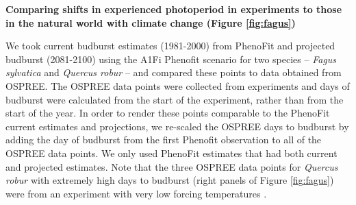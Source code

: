 \documentclass{article}
\begin{document}
\par \textbf{Comparing shifts in experienced photoperiod in experiments to those in the natural world with climate change (Figure \ref{fig:fagus})}
\par We took current budburst estimates (1981-2000) from PhenoFit \citep{duputie2015} and projected budburst (2081-2100) using the A1Fi Phenofit scenario for two species -- \textit{Fagus sylvatica} and \textit{Quercus robur} -- and compared these points to data obtained from OSPREE. The OSPREE data points were collected from experiments and days of budburst were calculated from the start of the experiment, rather than from the start of the year. In order to render these points comparable to the PhenoFit current estimates and projections, we re-scaled the OSPREE days to budburst by adding the day of budburst from the first Phenofit observation to all of the OSPREE data points. We only used PhenoFit estimates that had both current and projected estimates. Note that the three OSPREE data points for \textit{Quercus robur} with extremely high days to budburst (right panels of Figure \ref{fig:fagus}) were from an experiment with very low forcing temperatures \citep[][3.8-5.7$^{\circ}$]{Morin:2010aa}. 


\clearpage
\end{document}
